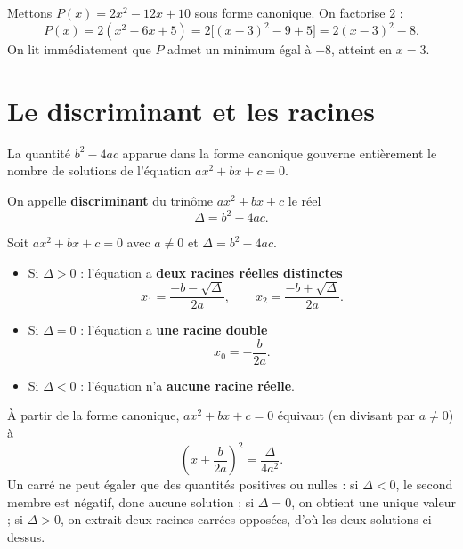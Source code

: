 \begin{exemple}
Mettons $P(x)=2x^2-12x+10$ sous forme canonique. On factorise $2$ :
\[ P(x)=2(x^2-6x+5)=2\big[(x-3)^2-9+5\big]=2(x-3)^2-8. \]
On lit immédiatement que $P$ admet un minimum égal à $-8$, atteint en $x=3$.
\end{exemple}

\section{Le discriminant et les racines}

La quantité $b^2-4ac$ apparue dans la forme canonique gouverne entièrement le
nombre de solutions de l'équation $ax^2+bx+c=0$.

\begin{definition}[Discriminant]
On appelle \textbf{discriminant} du trinôme $ax^2+bx+c$ le réel
\[ \Delta = b^2-4ac. \]
\end{definition}

\begin{theoreme}
Soit $ax^2+bx+c=0$ avec $a\neq 0$ et $\Delta=b^2-4ac$.
\begin{itemize}
  \item Si $\Delta>0$ : l'équation a \textbf{deux racines réelles distinctes}
  \[ x_1=\frac{-b-\sqrt{\Delta}}{2a}, \qquad x_2=\frac{-b+\sqrt{\Delta}}{2a}. \]
  \item Si $\Delta=0$ : l'équation a \textbf{une racine double}
  \[ x_0=-\frac{b}{2a}. \]
  \item Si $\Delta<0$ : l'équation n'a \textbf{aucune racine réelle}.
\end{itemize}
\end{theoreme}

\begin{aretenir}
À partir de la forme canonique, $ax^2+bx+c=0$ équivaut (en divisant par $a\neq 0$) à
\[ \left(x+\frac{b}{2a}\right)^{\!2}=\frac{\Delta}{4a^2}. \]
Un carré ne peut égaler que des quantités positives ou nulles : si $\Delta<0$, le
second membre est négatif, donc aucune solution ; si $\Delta=0$, on obtient une
unique valeur ; si $\Delta>0$, on extrait deux racines carrées opposées, d'où les
deux solutions ci-dessus.
\end{aretenir}

